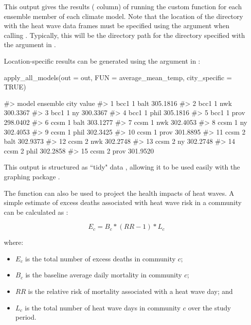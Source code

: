 This output gives the results ( column) of running the
custom function for each ensemble member of each climate model. Note
that the location of the directory with the heat wave data frames must
be specified using the  argument when calling
. Typically, this will be the directory path
for the directory specified with the  argument in
.

Location-specific results can be generated using the
 argument in :

\begin{Schunk}
\begin{Sinput}
apply_all_models(out = out, FUN = average_mean_temp, city_specific = TRUE)
\end{Sinput}
\begin{Soutput}
#>    model ensemble city    value
#> 1   bcc1        1 balt 305.1816
#> 2   bcc1        1  nwk 300.3367
#> 3   bcc1        1   ny 300.3367
#> 4   bcc1        1 phil 305.1816
#> 5   bcc1        1 prov 298.0402
#> 6   ccsm        1 balt 303.1277
#> 7   ccsm        1  nwk 302.4053
#> 8   ccsm        1   ny 302.4053
#> 9   ccsm        1 phil 302.3425
#> 10  ccsm        1 prov 301.8895
#> 11  ccsm        2 balt 302.9373
#> 12  ccsm        2  nwk 302.2748
#> 13  ccsm        2   ny 302.2748
#> 14  ccsm        2 phil 302.2858
#> 15  ccsm        2 prov 301.9520
\end{Soutput}
\end{Schunk}

This output is structured as ``tidy" data \citep{wickham2014tidy},
allowing it to be used easily with the graphing package
 \citep{ggplot2}.

The  function can also be used to project the
health impacts of heat waves. A simple estimate of excess deaths
associated with heat wave risk in a community can be calculated as
\citep{peng2011toward}:

\begin{equation}
E_c = B_c * (RR - 1) * L_c 
\label{eq:healthimpacts}
\end{equation}

where:

\begin{itemize}
\item $E_c$ is the total number of excess deaths in community $c$;
\item $B_c$ is the baseline average daily mortality in community $c$; 
\item $RR$ is the relative risk of mortality associated with a heat wave day; and 
\item $L_c$ is the total number of heat wave days in community $c$ over the study period.
\end{itemize}

